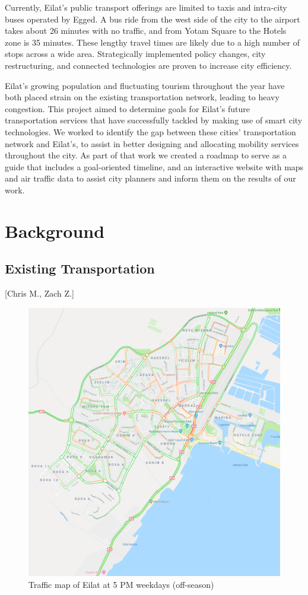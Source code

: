 \documentclass[12pt]{article}                         %
\begin{document}
Currently, Eilat’s public transport offerings are limited to taxis and intra-city buses operated by Egged. A bus ride from the west side of the city to the airport takes about 26 minutes with no traffic, and from Yotam Square to the Hotels zone is 35 minutes. These lengthy travel times are likely due to a high number of stops across a wide area. Strategically implemented policy changes, city restructuring, and connected technologies are proven to increase city efficiency.

Eilat’s growing population and fluctuating tourism throughout the year have both placed strain on the existing transportation network, leading to heavy congestion. This project aimed to determine goals for Eilat’s future transportation services that have successfully tackled by making use of smart city technologies. We worked to identify the gap between these cities’ transportation network and Eilat’s, to assist in better designing and allocating mobility services throughout the city. As part of that work we created a roadmap to serve as a guide that includes a goal-oriented timeline, and an interactive website with maps and air traffic data to assist city planners and inform them on the results of our work.
 
\newpage
\section{Background}

\subsection{Existing Transportation}[Chris M., Zach Z.]

\begin{figure}[h]
    \centering
    \includegraphics[scale=1]{eilat_traffic.png}
    \caption{Traffic map of Eilat at 5 PM weekdays (off-season)}
    \label{img:eilatTraffic}
\end{figure}
\end{document}
